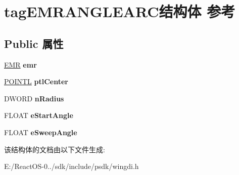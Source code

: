 \hypertarget{structtag_e_m_r_a_n_g_l_e_a_r_c}{}\section{tag\+E\+M\+R\+A\+N\+G\+L\+E\+A\+R\+C结构体 参考}
\label{structtag_e_m_r_a_n_g_l_e_a_r_c}
\subsection*{Public 属性}
\begin{DoxyCompactItemize}
\item 
\mbox{\label{structtag_e_m_r_a_n_g_l_e_a_r_c_a92bc225976983b85892a906b23ec667d}} 
\hyperlink{structtag_e_m_r}{E\+MR} {\bfseries emr}
\item 
\mbox{\label{structtag_e_m_r_a_n_g_l_e_a_r_c_af5bc7946c58ae6b668bb6866300a073a}} 
\hyperlink{struct___p_o_i_n_t_l}{P\+O\+I\+N\+TL} {\bfseries ptl\+Center}
\item 
\mbox{\label{structtag_e_m_r_a_n_g_l_e_a_r_c_aa3e52192c1d2284707e0e65a98cf5104}} 
D\+W\+O\+RD {\bfseries n\+Radius}
\item 
\mbox{\label{structtag_e_m_r_a_n_g_l_e_a_r_c_a7c5f6629eadf31d1d0052123fdf8c16e}} 
F\+L\+O\+AT {\bfseries e\+Start\+Angle}
\item 
\mbox{\label{structtag_e_m_r_a_n_g_l_e_a_r_c_a07b016e2868f0a812c23ea275a937592}} 
F\+L\+O\+AT {\bfseries e\+Sweep\+Angle}
\end{DoxyCompactItemize}


该结构体的文档由以下文件生成\+:\begin{DoxyCompactItemize}
\item 
E\+:/\+React\+O\+S-\/0../sdk/include/psdk/wingdi.\+h\end{DoxyCompactItemize}
